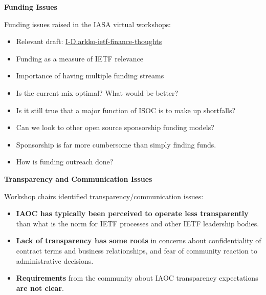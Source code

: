 \documentclass[helvetica]{seminar}
\newcommand{\heading}[1]{%
  \begin{center} 
    \large\bf 
    #1 
  \end{center} 
  \vspace{.4 in}}
\begin{document}
\begin{slide}
\heading{Funding Issues}

Funding issues raised in the IASA virtual workshops:
\begin{itemize}
\item Relevant draft: \href{https://tools.ietf.org/html/draft-arkko-ietf-finance-thoughts-00}{I-D.arkko-ietf-finance-thoughts}
\item Funding as a measure of IETF relevance
\item Importance of having multiple funding streams
\item Is the current mix optimal? What would be better?
\item Is it still true that a major function of ISOC is to make up
  shortfalls?
\item Can we look to other open source sponsorship funding models?
\item Sponsorship is far more cumbersome than simply finding funds.
\item How is funding outreach done?
\end{itemize}

\end{slide}


\begin{slide}
\heading{Transparency and Communication Issues}

Workshop chairs identified transparency/communication issues:
{\footnotesize
\begin{itemize}
\item \textbf{IAOC has typically been perceived to operate less
  transparently} than what is the norm for IETF processes and other
  IETF leadership bodies.
\item \textbf{Lack of transparency has some roots} in concerns about
  confidentiality of contract terms and business relationships, and
  fear of community reaction to administrative decisions.
\item \textbf{Requirements} from the community about IAOC transparency
  expectations \textbf{are not clear}.
\end{itemize}
}

\end{slide}
\end{document}
